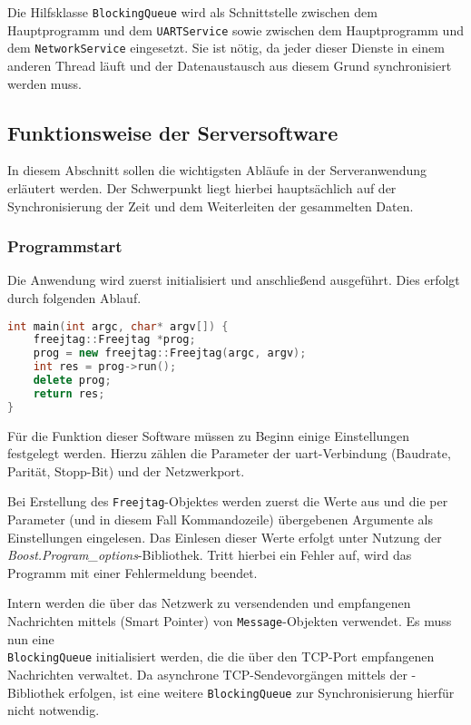 Die Hilfsklasse \texttt{BlockingQueue} wird als Schnittstelle zwischen dem
Hauptprogramm und dem \texttt{UARTService} sowie zwischen dem Hauptprogramm
und dem \texttt{NetworkService} eingesetzt. Sie ist nötig, da jeder dieser
Dienste in einem anderen Thread läuft und der Datenaustausch aus diesem Grund
synchronisiert werden muss.

\subsection{Funktionsweise der Serversoftware}\label{subs:abl}
In diesem Abschnitt sollen die wichtigsten Abläufe in der Serveranwendung
erläutert werden. Der Schwerpunkt liegt hierbei hauptsächlich auf der
Synchronisierung der Zeit und dem Weiterleiten der gesammelten Daten.
\subsubsection*{Programmstart}\label{subs:start}
Die Anwendung wird zuerst initialisiert und anschließend ausgeführt. Dies
erfolgt durch folgenden Ablauf.
\begin{lstlisting}[language=C++]
int main(int argc, char* argv[]) {
    freejtag::Freejtag *prog;
    prog = new freejtag::Freejtag(argc, argv);
    int res = prog->run();
    delete prog;
    return res;
}
\end{lstlisting}

Für die Funktion dieser Software müssen zu Beginn einige Einstellungen
festgelegt werden. Hierzu zählen die Parameter der \gls{uart}-Verbindung
(Baudrate, Parität, Stopp-Bit) und der Netzwerkport.

Bei Erstellung des \texttt{Freejtag}-Objektes werden zuerst die Werte aus
 und die per Parameter (und in diesem Fall
Kommandozeile) übergebenen Argumente als Einstellungen eingelesen.
Das Einlesen dieser Werte erfolgt unter Nutzung der
\emph{Boost.Program\_options}-Bibliothek. Tritt hierbei ein Fehler auf, wird das
Programm mit einer Fehlermeldung beendet.

Intern werden die über das Netzwerk zu versendenden und empfangenen Nachrichten
mittels (Smart Pointer) von
\texttt{Message}-Objekten verwendet. Es muss nun eine \\\texttt{BlockingQueue}
initialisiert werden, die die über den TCP-Port empfangenen Nachrichten
verwaltet. Da asynchrone TCP-Sendevorgängen mittels der
-Bibliothek erfolgen, ist eine weitere
\texttt{BlockingQueue} zur Synchronisierung hierfür nicht notwendig.

